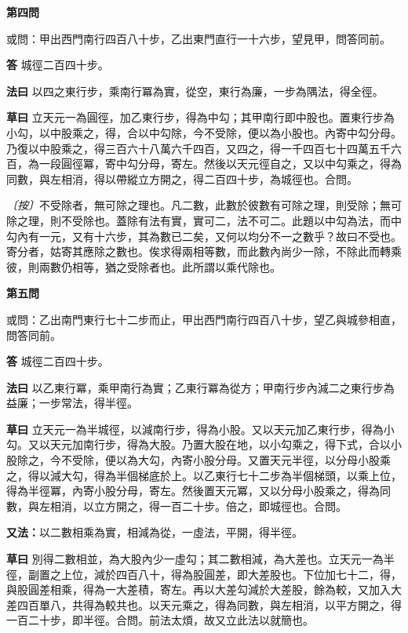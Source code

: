 \documentclass[11pt,a4paper]{article}
\newcommand{\problem}[1]{\par\noindent\textbf{\color{problemcolor}#1}\par\nopagebreak}
\newcommand{\answer}[1]{\par\noindent\textbf{答} #1\par}
\newcommand{\method}[1]{\par\noindent\textbf{法曰} #1\par}
\newcommand{\workings}[1]{\par\noindent\textbf{草曰} #1\par}
\newcommand{\remark}[1]{\par\noindent\textit{〔按〕}#1\par}
\begin{document}
\problem{第四問}

\noindent 或問：甲出西門南行四百八十步，乙出東門直行一十六步，望見甲，問答同前。

\answer{城徑二百四十步。}

\method{以四之東行步，乘南行冪為實，從空，東行為廉，一步為隅法，得全徑。}

\workings{立天元一為圓徑，加乙東行步，得為中勾；其甲南行即中股也。置東行步為小勾，以中股乘之，得，合以中勾除，今不受除，便以為小股也。內寄中勾分母。乃復以中股乘之，得三百六十八萬六千四百，又四之，得一千四百七十四萬五千六百，為一段圓徑冪，寄中勾分母，寄左。然後以天元徑自之，又以中勾乘之，得為同數，與左相消，得以帶縱立方開之，得二百四十步，為城徑也。合問。}

\remark{不受除者，無可除之理也。凡二數，此數於彼數有可除之理，則受除；無可除之理，則不受除也。蓋除有法有實，實可二，法不可二。此題以中勾為法，而中勾內有一元，又有十六步，其為數已二矣，又何以均分不一之數乎？故曰不受也。寄分者，姑寄其應除之數也。俟求得兩相等數，而此數內尚少一除，不除此而轉乘彼，則兩數仍相等，猶之受除者也。此所謂以乘代除也。}

\vspace{0.5cm}

\problem{第五問}

\noindent 或問：乙出南門東行七十二步而止，甲出西門南行四百八十步，望乙與城參相直，問答同前。

\answer{城徑二百四十步。}

\method{以乙東行冪，乘甲南行為實；乙東行冪為從方；甲南行步內減二之東行步為益廉；一步常法，得半徑。}

\workings{立天元一為半城徑，以減南行步，得為小股。又以天元加乙東行步，得為小勾。又以天元加南行步，得為大股。乃置大股在地，以小勾乘之，得下式，合以小股除之，今不受除，便以為大勾，內寄小股分母。又置天元半徑，以分母小股乘之，得以減大勾，得為半個梯底於上。以乙東行七十二步為半個梯頭，以乘上位，得為半徑冪，內寄小股分母，寄左。然後置天元冪，又以分母小股乘之，得為同數，與左相消，以立方開之，得一百二十步。倍之，即城徑也。合問。}

\vspace{0.3cm}

\noindent\textbf{又法：}以二數相乘為實，相減為從，一虛法，平開，得半徑。

\workings{別得二數相並，為大股內少一虛勾；其二數相減，為大差也。立天元一為半徑，副置之上位，減於四百八十，得為股圓差，即大差股也。下位加七十二，得，與股圓差相乘，得為一大差積，寄左。再以大差勾減於大差股，餘為較，又加入大差四百單八，共得為較共也。以天元乘之，得為同數，與左相消，以平方開之，得一百二十步，即半徑。合問。前法太煩，故又立此法以就簡也。}
\end{document}

